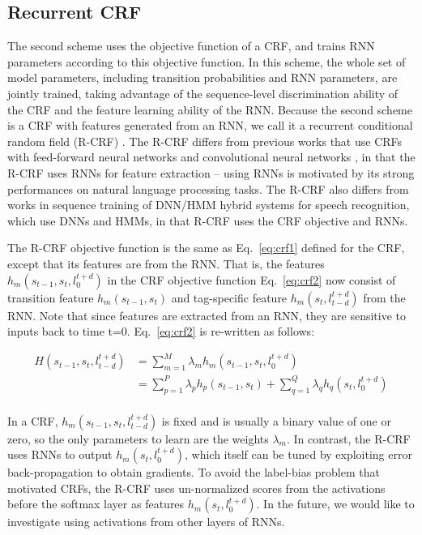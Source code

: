 \subsection{Recurrent CRF}

The second scheme uses the objective function of a CRF, and trains RNN
parameters according to this objective function. In this scheme, the whole set
of model parameters, including transition probabilities and RNN parameters, are
jointly trained, taking advantage of the sequence-level discrimination ability
of the CRF and the feature learning ability of the RNN. Because the second
scheme is a CRF with features generated from an RNN, we call it a recurrent
conditional random field (R-CRF) \citep{rnn41,rnn42}.  The R-CRF differs from previous
works that use CRFs with feed-forward neural networks \citep{rnn43,rnn44} and convolutional
neural networks \citep{rnn45}, in that the R-CRF uses RNNs for feature extraction –
using RNNs is motivated by its strong performances on natural language
processing tasks. The R-CRF also differs from works in sequence training of
DNN/HMM hybrid systems \citep{rnn46, rnn47, rnn48} for speech recognition, which use DNNs and HMMs,
in that R-CRF uses the CRF objective and RNNs. 

The R-CRF objective function is the same as Eq.~\ref{eq:crf1} defined for the
CRF, except that its features are from the RNN. That is, the features
$h_{m}(s_{t-1},s_{t},l_{0}^{t+d})$ in the CRF objective function
Eq.~\ref{eq:crf2} now consist of transition feature $h_{m}(s_{t-1},s_{t})$ and
tag-specific feature $h_{m}(s_{t},l_{t-d}^{t+d})$ from the RNN. Note that since
features are extracted from an RNN, they are sensitive to inputs back to time
t=0. Eq.~\ref{eq:crf2} is re-written as follows:

\begin{align*}
H(s_{t-1}, s_{t},l_{t-d}^{t+d}) & = \sum_{m=1}^{M} \lambda_{m} h_{m} (s_{t-1}, s_{t}, l_{0}^{t+d}) \\
 & = \sum_{p=1}^{P} \lambda_{p} h_{p}(s_{t-1}, s_{t}) + \sum_{q=1}^{Q} \lambda_{q} h_{q}(s_{t}, l_{0}^{t+d})\\
\end{align*}

In a CRF, $h_{m}(s_{t-1},s_{t},l_{t-d}^{t+d} )$ is fixed and is usually a
binary value of one or zero, so the only parameters to learn are the weights
$\lambda_{m}$.  In contrast, the R-CRF uses RNNs to output
$h_{m}(s_{t},l_{0}^{t+d})$, which itself can be tuned by exploiting error
back-propagation to obtain gradients. To avoid the label-bias problem \citep{rnn6} that
motivated CRFs, the R-CRF uses un-normalized scores from the activations before
the softmax layer as features $h_{m}(s_{t},l_{0}^{t+d})$. In the future, we would like
to investigate using activations from other layers of RNNs.  

